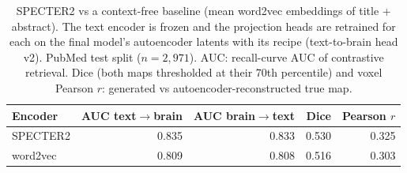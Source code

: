 \begin{table}[ht]
\centering
\caption{SPECTER2 vs a context-free baseline (mean word2vec embeddings of title + abstract). The text encoder is frozen and the projection heads are retrained for each on the final model's autoencoder latents with its recipe (text-to-brain head v2). PubMed test split ($n = 2{,}971$). AUC: recall-curve AUC of contrastive retrieval. Dice (both maps thresholded at their 70th percentile) and voxel Pearson $r$: generated vs autoencoder-reconstructed true map.}
\label{tab:context_free_baseline}
\begin{tabular}{lrrrr}
\toprule
Encoder & AUC text$\rightarrow$brain & AUC brain$\rightarrow$text & Dice & Pearson $r$ \\
\midrule
SPECTER2 & 0.835 & 0.833 & 0.530 & 0.325 \\
word2vec & 0.809 & 0.808 & 0.516 & 0.303 \\
\bottomrule
\end{tabular}
\end{table}
